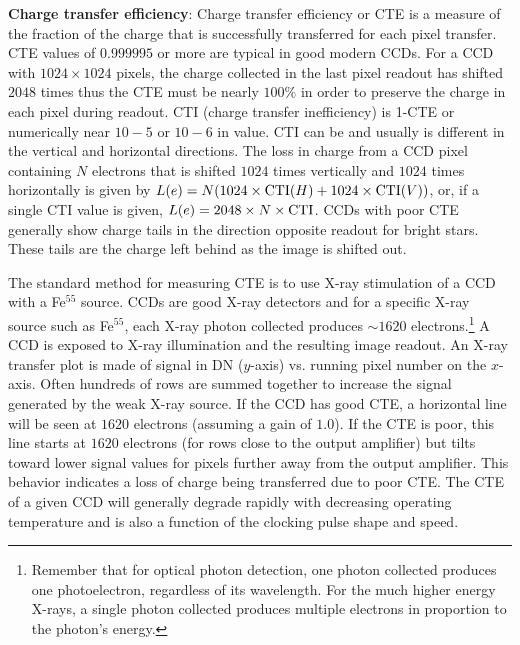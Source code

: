\documentclass[a4paper,10pt]{article}
\begin{document}
{\noindent}\textbf{Charge transfer efficiency}: Charge transfer efficiency or CTE is a measure of the fraction of the charge that is successfully transferred for each pixel transfer. CTE values of $0.999995$ or more are typical in good modern CCDs. For a CCD with $1024\times1024$ pixels, the charge collected in the last pixel readout has shifted $2048$ times thus the CTE must be nearly $100\%$ in order to preserve the charge in each pixel during readout. CTI (charge transfer inefficiency) is 1-CTE or numerically near $10-5$ or $10-6$ in value. CTI can be and usually is different in the vertical and horizontal directions. The loss in charge from a CCD pixel containing $N$ electrons that is shifted $1024$ times vertically and $1024$ times horizontally is given by $L(e)=N(1024\times {\rm CTI}(H)+1024\times {\rm CTI}(V))$, or, if a single CTI value is given, $L(e)=2048\times N\times {\rm CTI}$. CCDs with poor CTE generally show charge tails in the direction opposite readout for bright stars. These tails are the charge left behind as the image is shifted out.

{\noindent}The standard method for measuring CTE is to use X-ray stimulation of a CCD with a Fe$^{55}$ source. CCDs are good X-ray detectors and for a specific X-ray source such as Fe$^{55}$, each X-ray photon collected produces $\sim1620$ electrons.\footnote{Remember that for optical photon detection, one photon collected produces one photoelectron, regardless of its wavelength. For the much higher energy X-rays, a single photon collected produces multiple electrons in proportion to the photon's energy.} A CCD is exposed to X-ray illumination and the resulting image readout. An X-ray transfer plot is made of signal in DN ($y$-axis) vs. running pixel number on the $x$-axis. Often hundreds of rows are summed together to increase the signal generated by the weak X-ray source. If the CCD has good CTE, a horizontal line will be seen at $1620$ electrons (assuming a gain of $1.0$). If the CTE is poor, this line starts at $1620$ electrons (for rows close to the output amplifier) but tilts toward lower signal values for pixels further away from the output amplifier. This behavior indicates a loss of charge being transferred due to poor CTE. The CTE of a given CCD will generally degrade rapidly with decreasing operating temperature and is also a function of the clocking pulse shape and speed.
\end{document}
